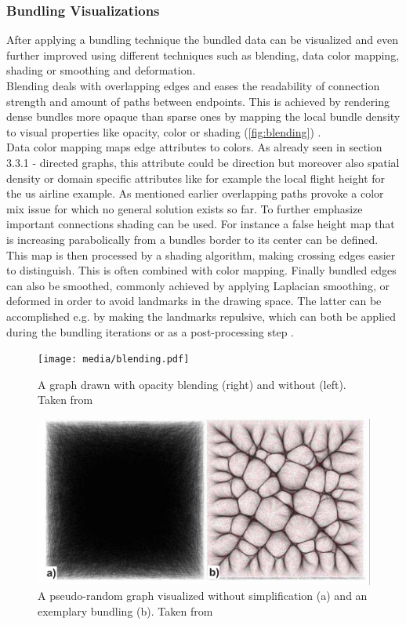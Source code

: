 \subsubsection{Bundling Visualizations}
After applying a bundling technique the bundled data can be visualized and even further improved using different techniques such as blending, data color mapping, shading or smoothing and deformation.\\
Blending deals with overlapping edges and eases the readability of connection strength and amount of paths between endpoints. This is achieved by rendering dense bundles more opaque than sparse ones by mapping the local bundle density to visual properties like opacity, color or shading (\autoref{fig:blending}) \cite{Lhuillier2017}.\\
Data color mapping maps edge attributes to colors. As already seen in section 3.3.1 - directed graphs, this attribute could be direction but moreover also spatial density or domain specific attributes like for example the local flight height for the us airline example. As mentioned earlier overlapping paths provoke a color mix issue for which no general solution exists so far.
To further emphasize important connections shading can be used. For instance a false height map that is increasing parabolically from a bundles border to its center can be defined. This map is then processed by a shading algorithm, making crossing edges easier to distinguish. This is often combined with color mapping.
Finally bundled edges can also be smoothed, commonly achieved by applying Laplacian smoothing, or deformed in order to avoid landmarks in the drawing space. The latter can be accomplished e.g. by making the landmarks repulsive, which can both be applied during the bundling iterations or as a post-processing step \cite{Lhuillier2017}.

\begin{figure}
    \centering
    \texttt{[image: media/blending.pdf]}
    \caption{A graph drawn with opacity blending (right) and without (left). Taken from \cite{Lhuillier2017}}
    \label{fig:blending}
\end{figure}
\begin{figure}
    \centering
    \includegraphics[scale=0.7]{media/faithfullness_bundling.pdf}
    \caption{A pseudo-random graph visualized without simplification (a) and an exemplary bundling (b). Taken from \cite{Lhuillier2017}}
    \label{fig:faithfulness}
\end{figure}
